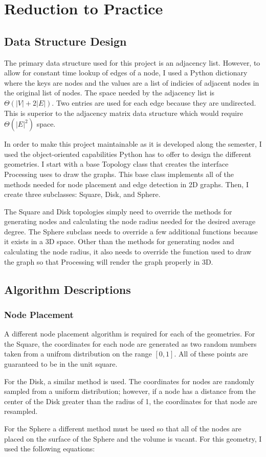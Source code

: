 \documentclass{article}
\begin{document}
\section{Reduction to Practice}

    \subsection{Data Structure Design}
    The primary data structure used for this project is an adjacency list. However, to allow for constant time lookup of edges of a node, I used a Python dictionary where the keys are nodes and the values are a list of indicies of adjacent nodes in the original list of nodes. The space needed by the adjacency list is $\Theta(|V| + 2|E|)$. Two entries are used for each edge because they are undirected. This is superior to the adjacency matrix data structure which would require $\Theta(|E|^2)$ space.
    \par
    In order to make this project maintainable as it is developed along the semester, I used the object-oriented capabilities Python has to offer to design the different geometries. I start with a base Topology class that creates the interface Processing uses to draw the graphs. This base class implements all of the methods needed for node placement and edge detection in 2D graphs. Then, I create three subclasses: Square, Disk, and Sphere.
    \par
    The Square and Disk topologies simply need to override the methods for generating nodes and calculating the node radius needed for the desired average degree. The Sphere subclass needs to override a few additional functions because it exists in a 3D space. Other than the methods for generating nodes and calculating the node radius, it also needs to override the function used to draw the graph so that Processing will render the graph properly in 3D.

    \subsection{Algorithm Descriptions}

        \subsubsection{Node Placement}
        A different node placement algorithm is required for each of the geometries. For the Square, the coordinates for each node are generated as two random numbers taken from a unifrom distribution on the range $[0,1]$. All of these points are guaranteed to be in the unit square.
        \par
        For the Disk, a similar method is used. The coordinates for nodes are randomly sampled from a uniform distribution; however, if a node has a distance from the center of the Disk greater than the radius of 1, the coordinates for that node are resampled.
        \par
        For the Sphere a different method must be used so that all of the nodes are placed on the surface of the Sphere and the volume is vacant. For this geometry, I used the following equations:
\end{document}
